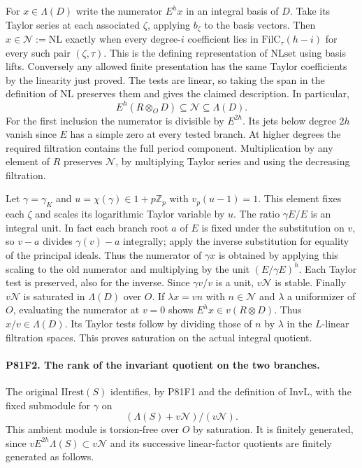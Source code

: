 For $x\in\Lambda(D)$ write the numerator $E^h x$ in an
integral basis of $D$. Take its Taylor series at each associated
$\zeta$, applying $b_\zeta$ to the basis vectors. Then
$x\in\mathcal N:=\mathrm{NL}$ exactly when every degree-$i$
coefficient lies in $\mathrm{FilC}_\tau(h-i)$ for every such
pair $(\zeta,\tau)$. This is the defining representation of
$\mathrm{NLset}$ using basis lifts. Conversely any allowed finite
presentation has the same Taylor coefficients by the linearity
just proved. The tests are linear, so taking the span in the
definition of $\mathrm{NL}$ preserves them and gives the claimed
description. In particular,
\[
 E^h(R\otimes_O D)\subseteq\mathcal N\subseteq\Lambda(D).
\]
For the first inclusion the numerator is divisible by $E^{2h}$.
Its jets below degree $2h$ vanish since $E$ has a simple zero
at every tested branch. At higher degrees the required filtration
contains the full period component. Multiplication by any element
of $R$ preserves $\mathcal N$, by multiplying Taylor series and
using the decreasing filtration.

Let $\gamma=\gamma_K$ and $u=\chi(\gamma)\in 1+p\mathbb Z_p$
with $v_p(u-1)=1$. This element fixes each $\zeta$ and scales
its logarithmic Taylor variable by $u$. The ratio $\gamma E/E$
is an integral unit. In fact each branch root $a$ of $E$ is
fixed under the substitution on $v$, so $v-a$ divides
$\gamma(v)-a$ integrally; apply the inverse substitution for
equality of the principal ideals. Thus the numerator of $\gamma x$
is obtained by applying this scaling to the old numerator and
multiplying by the unit $(E/\gamma E)^h$. Each Taylor test is
preserved, also for the inverse. Since $\gamma v/v$ is a unit,
$v\mathcal N$ is stable. Finally $v\mathcal N$ is saturated in
$\Lambda(D)$ over $O$. If $\lambda x=v n$ with $n\in\mathcal N$
and $\lambda$ a uniformizer of $O$, evaluating the numerator at
$v=0$ shows $E^h x\in v(R\otimes D)$. Thus $x/v\in\Lambda(D)$.
Its Taylor tests follow by dividing those of $n$ by $\lambda$
in the $L$-linear filtration spaces. This proves saturation on
the actual integral quotient.

\paragraph{P81F2. The rank of the invariant quotient on the two branches.}
The original $\mathrm{IIrest}(S)$ identifies, by P81F1 and the
definition of $\mathrm{InvL}$, with the fixed submodule for
$\gamma$ on
\[
        (\Lambda(S)+v\mathcal N)/(v\mathcal N).
\]
This ambient module is torsion-free over $O$ by saturation.
It is finitely generated, since $v E^{2h}\Lambda(S)\subset
v\mathcal N$ and its successive linear-factor quotients are
finitely generated as follows.

